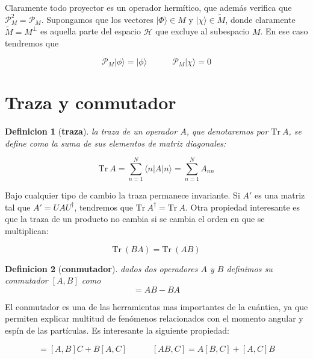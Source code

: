 \documentclass[12pt]{book}
\numberwithin{equation}{chapter}
\numberwithin{figure}{chapter}
\newcommand{\tquad}{\quad \quad \quad}
\newcommand{\Tr}{\mathrm{Tr} \ }
\newtheorem{definition}{Definicion}[section]
\begin{document}
Claramente todo proyector es un operador hermítico, que además verifica que $\mathcal{P}_M^2 = \mathcal{P}_M$. Supongamos que los vectores $|\Phi \rangle \in M$ y $| \chi \rangle \in \tilde{M}$, donde claramente $\tilde{M} = M^\perp$ es aquella parte del espacio $\mathcal{H}$ que excluye al subespacio $M$. En ese caso tendremos que

\begin{equation}
\mathcal{P}_M | \phi \rangle = | \phi \rangle \tquad \mathcal{P}_M | \chi \rangle = 0
\end{equation}

\section{Traza y conmutador}

\begin{definition}[\textbf{traza}]
la traza de un operador $A$, que denotaremos por $\Tr A$, se define como la suma de sus elementos de matriz diagonales:

\begin{equation}
\Tr A = \sum_{n=1}^N \langle n | A | n \rangle = \sum_{n=1}^N A_{nn}
\end{equation}
\end{definition}

Bajo cualquier tipo de cambio la traza permanece invariante. Si $A'$ es una matriz tal que $A' = UAU^\dagger$, tendremos que $\Tr A^\dagger = \Tr A$. Otra propiedad interesante es que la traza de un producto no cambia si se cambia el orden en que se multiplican:

\begin{equation}
\Tr (BA) = \Tr (AB)
\end{equation}

\begin{definition}[\textbf{conmutador}] 
dados dos operadores $A$ y $B$ definimos su conmutador $[A,B]$ como 
\begin{equation}
[A,B] = A B - B A
\end{equation}
\end{definition}

El conmutador es una de las herramientas mas importantes de la cuántica, ya que permiten explicar multitud de fenómenos relacionados con el momento angular y espín de las partículas. Es interesante la siguiente propiedad:

\begin{equation}
[A,BC] = [A,B]C + B[A,C] \tquad [AB,C] = A[B,C] + [A,C]B
\end{equation} 
\end{document}
